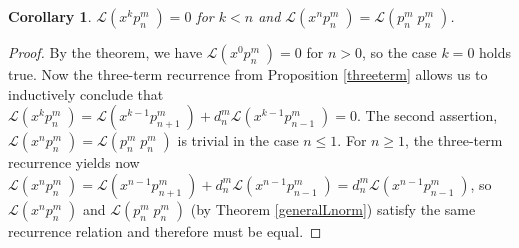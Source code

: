 \documentclass{amsart}
\newcommand{\p}[2]{p_{#1}^{#2}\;\!\!}
\renewcommand{\L}{\mathcal{L}}
\theoremstyle{plain}
\newtheorem{corollary}[theorem]{Corollary}
\theoremstyle{definition}
\theoremstyle{remark}
\begin{document}
\begin{corollary} \label{pcor}
 $\L(x^{k}\p{n}{m}) = 0$ for $k < n$ and $\L(x^n\p{n}{m})= \L(\p{n}{m}\p{n}{m})$.
\end{corollary}
\begin{proof} By the theorem, we have $\L(x^{0}\p{n}{m}) = 0$ for $n>0$, so the case $k=0$ holds true.
Now the three-term recurrence from Proposition \ref{threeterm} allows us to inductively conclude that $\L(x^k\p{n}{m}) = \L(x^{k-1}\p{n+1}{m})+d_n^m\L(x^{k-1}\p{n-1}{m}) =0$.
The second assertion, $\L(x^n\p{n}{m})= \L(\p{n}{m}\p{n}{m})$ is trivial in the case $n\leq 1$. For $n\geq 1$, the three-term recurrence yields now $\L(x^n\p{n}{m}) = \L(x^{n-1}\p{n+1}{m})+d_n^m\L(x^{n-1}\p{n-1}{m})=d_n^m\L(x^{n-1}\p{n-1}{m})$, so $\L(x^n\p{n}{m})$ and $\L(\p{n}{m}\p{n}{m})$ (by Theorem \ref{generalLnorm}) satisfy the same recurrence relation and therefore must be equal.
\end{proof}
\end{document}
